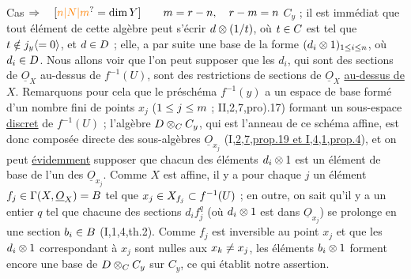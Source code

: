 Cas  $\Rightarrow\quad [\unsure{n|N|m}=\dim Y]\qquad
 m=r-n,\quad r-m=n$
$C_y$ ; il est immédiat que tout élément de cette algèbre peut s'écrir \margin{\handwritten{$\ast$}}$d\otimes(1/t)$, où $t\in C$  est tel que $t\handwritten{\notin}j_y\inserted{\handwritten{=0}}$, et $d\in D$ ; elle, a par suite une base de la forme $(d_i\otimes1)_{1\leq i\leq n}$, où $d_i\in D$. Nous allons voir que l'on peut supposer que les $d_i$, qui sont des sections de $\underline O_X$ au-dessus de $f^{-1}(U)$, sont des restrictions de sections de $\underline O_X$ \uline{au-dessus de} $X$. Remarquons pour cela que le préschéma $f^{-1}(y)$ a un espace de base formé d'un nombre fini de points $x_j$ ($1\leq j\leq m$ ; II,2,7,pro).17) formant un sous-espace \uline{discret} de $f^{-1}(U)$ ; l'algèbre  $D\otimes_C C_y$, qui est l'anneau de ce schéma affine, est donc composée directe des sous-algèbres $\underline O_{x_j}$ (I,\uline{2,7,prop.19 et I,4,1,prop.4}), \margin{\handwritten{!}}et on peut \uline{évidemment} supposer que chacun des éléments $d_i\otimes1$ est un élément de base
de l'un des $\underline O_{x_j}$. Comme $X$ est affine, il y a pour chaque $j$ un élément $f_j\in\Gamma(X,\underline O_X)=B$ tel que $x_j\in X_{f_j}\subset f^{-1}(U)$  ; en outre, on sait qu'il y a un entier $q$ tel que chacune des sections $d_i f_j^q$ (où $d_i\otimes1$ est dans $\underline O_{x_j}$) se prolonge en une section $b_i\in B$ (I,1,4,th.2). Comme $f_j$ est inversible au point $x_j$ et que les $d_i\otimes1$ correspondant à $x_j$ sont nulles aux $x_k\ne x_j$, les éléments $b_i\otimes1$ forment encore une base de $D\otimes_C C_y$ sur $C_y$, ce qui établit notre assertion.


